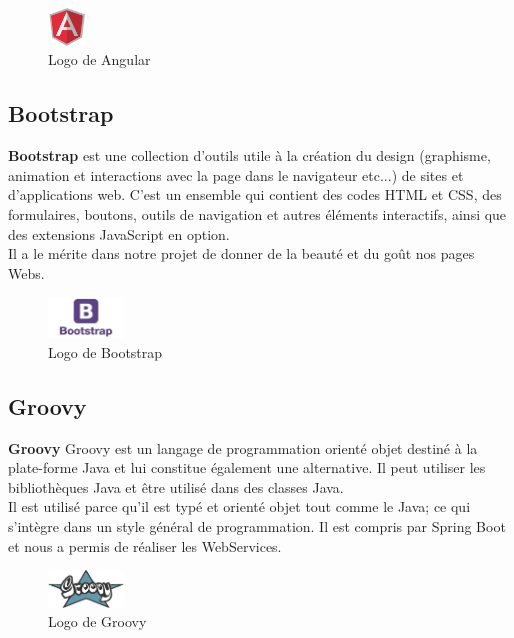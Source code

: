\documentclass[12pt]{report}
\begin{document}
	  \begin{figure}[H]
	    \begin{center}
	      \includegraphics[scale=0.3, width=1cm]{images/logoAngular.png}
	      \caption{Logo de Angular}
	    \end{center}
	  \end{figure}
	  
	\subsection{Bootstrap}
	    \textbf{Bootstrap} est une collection d'outils utile à la création du design (graphisme, animation et interactions avec la page dans le navigateur etc...) de sites et d'applications web. C'est un ensemble qui contient des codes HTML et CSS, des formulaires, boutons, outils de navigation et autres éléments interactifs, ainsi que des extensions JavaScript en option.\cite{bootstrap}
	    \\Il a le mérite dans notre projet de donner de la beauté et du goût nos pages Webs.
	    
	    \begin{figure}[H]
	      \begin{center}
		\includegraphics[scale=0.4, width=2cm]{images/logoBootstrap.png}
		\caption{Logo de Bootstrap}
	      \end{center}
	    \end{figure}
	  
	  \subsection{Groovy}
	    \textbf{Groovy} Groovy est un langage de programmation orienté objet destiné à la plate-forme Java et lui constitue également une alternative. Il peut utiliser les bibliothèques Java et être utilisé dans des classes Java.\cite{groovy}
	    \\Il est utilisé parce qu'il est typé et orienté objet tout comme le Java; ce qui s'intègre dans un style général de programmation. Il est compris par Spring Boot et nous a permis de réaliser les WebServices.
	    
	     \begin{figure}[H]
	      \begin{center}
		\includegraphics[scale=0.3, width=2cm]{images/logoGroovy.png}
		\caption{Logo de Groovy}
	      \end{center}
	    \end{figure}
	    
\end{document}
